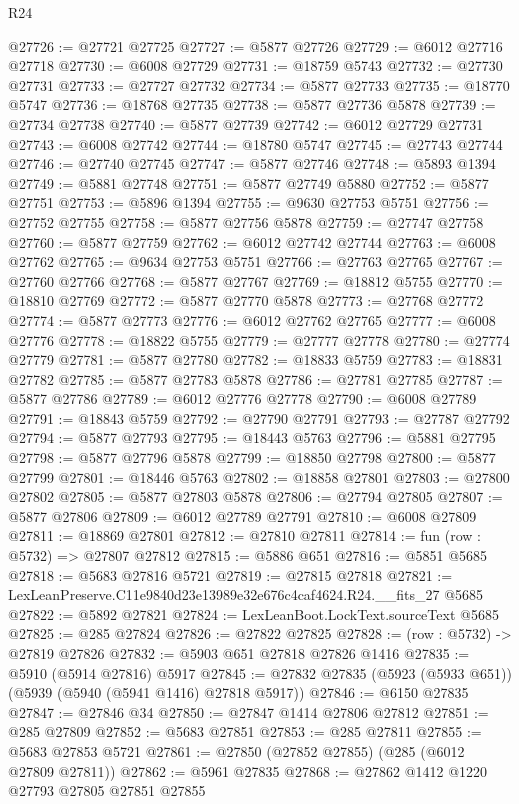 \begin{lexlean}{R24}
\begin{coremodule}
@27726 := @27721 @27725
@27727 := @5877 @27726
@27729 := @6012 @27716 @27718
@27730 := @6008 @27729
@27731 := @18759 @5743
@27732 := @27730 @27731
@27733 := @27727 @27732
@27734 := @5877 @27733
@27735 := @18770 @5747
@27736 := @18768 @27735
@27738 := @5877 @27736 @5878
@27739 := @27734 @27738
@27740 := @5877 @27739
@27742 := @6012 @27729 @27731
@27743 := @6008 @27742
@27744 := @18780 @5747
@27745 := @27743 @27744
@27746 := @27740 @27745
@27747 := @5877 @27746
@27748 := @5893 @1394
@27749 := @5881 @27748
@27751 := @5877 @27749 @5880
@27752 := @5877 @27751
@27753 := @5896 @1394
@27755 := @9630 @27753 @5751
@27756 := @27752 @27755
@27758 := @5877 @27756 @5878
@27759 := @27747 @27758
@27760 := @5877 @27759
@27762 := @6012 @27742 @27744
@27763 := @6008 @27762
@27765 := @9634 @27753 @5751
@27766 := @27763 @27765
@27767 := @27760 @27766
@27768 := @5877 @27767
@27769 := @18812 @5755
@27770 := @18810 @27769
@27772 := @5877 @27770 @5878
@27773 := @27768 @27772
@27774 := @5877 @27773
@27776 := @6012 @27762 @27765
@27777 := @6008 @27776
@27778 := @18822 @5755
@27779 := @27777 @27778
@27780 := @27774 @27779
@27781 := @5877 @27780
@27782 := @18833 @5759
@27783 := @18831 @27782
@27785 := @5877 @27783 @5878
@27786 := @27781 @27785
@27787 := @5877 @27786
@27789 := @6012 @27776 @27778
@27790 := @6008 @27789
@27791 := @18843 @5759
@27792 := @27790 @27791
@27793 := @27787 @27792
@27794 := @5877 @27793
@27795 := @18443 @5763
@27796 := @5881 @27795
@27798 := @5877 @27796 @5878
@27799 := @18850 @27798
@27800 := @5877 @27799
@27801 := @18446 @5763
@27802 := @18858 @27801
@27803 := @27800 @27802
@27805 := @5877 @27803 @5878
@27806 := @27794 @27805
@27807 := @5877 @27806
@27809 := @6012 @27789 @27791
@27810 := @6008 @27809
@27811 := @18869 @27801
@27812 := @27810 @27811
@27814 := fun (row : @5732) => @27807 @27812
@27815 := @5886 @651
@27816 := @5851 @5685
@27818 := @5683 @27816 @5721
@27819 := @27815 @27818
@27821 := LexLeanPreserve.C11e9840d23e13989e32e676c4caf4624.R24.__fits_27 @5685
@27822 := @5892 @27821
@27824 := LexLeanBoot.LockText.sourceText @5685
@27825 := @285 @27824
@27826 := @27822 @27825
@27828 := (row : @5732) -> @27819 @27826
@27832 := @5903 @651 @27818 @27826 @1416
@27835 := @5910 (@5914 @27816) @5917
@27845 := @27832 @27835 (@5923 (@5933 @651)) (@5939 (@5940 (@5941 @1416) @27818 @5917))
@27846 := @6150 @27835
@27847 := @27846 @34
@27850 := @27847 @1414 @27806 @27812
@27851 := @285 @27809
@27852 := @5683 @27851
@27853 := @285 @27811
@27855 := @5683 @27853 @5721
@27861 := @27850 (@27852 @27855) (@285 (@6012 @27809 @27811))
@27862 := @5961 @27835
@27868 := @27862 @1412 @1220 @27793 @27805 @27851 @27855

\end{coremodule}
\end{lexlean}
